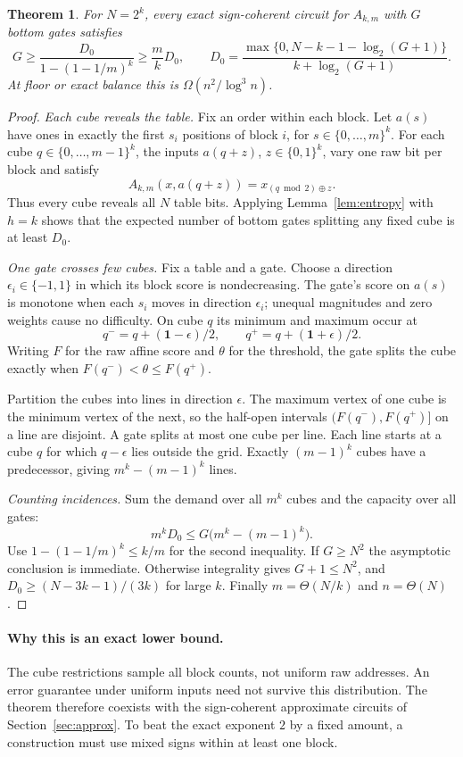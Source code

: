 \documentclass[11pt]{article}
\newtheorem{theorem}{Theorem}[section]
\newcommand{\bits}{\{0,1\}}
\begin{document}
\begin{theorem}\label{thm:coherent}
For $N=2^k$, every exact sign-coherent circuit for $A_{k,m}$ with $G$
bottom gates satisfies
$$
G\ge\frac{D_0}{1-(1-1/m)^k}\ge\frac m kD_0,
\qquad
D_0=\frac{\max\{0,N-k-1-\log_2(G+1)\}}{k+\log_2(G+1)}.
$$
At floor or exact balance this is $\Omega(n^2/\log^3 n)$.
\end{theorem}
\begin{proof}
\emph{Each cube reveals the table.}
Fix an order within each block. Let $a(s)$ have ones in exactly the first
$s_i$ positions of block $i$, for $s\in\{0,\ldots,m\}^k$.
For each cube $q\in\{0,\ldots,m-1\}^k$, the inputs $a(q+z)$,
$z\in\bits^k$, vary one raw bit per block and satisfy
$$A_{k,m}(x,a(q+z))=x_{(q\bmod2)\oplus z}.$$
Thus every cube reveals all $N$ table bits. Applying
Lemma~\ref{lem:entropy} with $h=k$ shows that the expected number of
bottom gates splitting any fixed cube is at least $D_0$.

\emph{One gate crosses few cubes.}
Fix a table and a gate. Choose a direction $\epsilon_i\in\{-1,1\}$ in
which its block score is nondecreasing. The gate's score on
$a(s)$ is monotone when each $s_i$ moves in direction $\epsilon_i$;
unequal magnitudes and zero weights cause no difficulty.
On cube $q$ its minimum and maximum occur at
$$q^-=q+(\mathbf1-\epsilon)/2,\qquad
q^+=q+(\mathbf1+\epsilon)/2.$$
Writing $F$ for the raw affine score and $\theta$ for the threshold, the
gate splits the cube exactly when $F(q^-)<\theta\le F(q^+)$.

Partition the cubes into lines in direction $\epsilon$.
The maximum vertex of one cube is the minimum vertex of the next, so
the half-open intervals $(F(q^-),F(q^+)]$ on a line are disjoint.
A gate splits at most one cube per line. Each line starts at a cube
$q$ for which $q-\epsilon$ lies outside the grid. Exactly $(m-1)^k$ cubes
have a predecessor, giving $m^k-(m-1)^k$ lines.

\emph{Counting incidences.}
Sum the demand over all $m^k$ cubes and the capacity over all gates:
$$m^kD_0\le G\bigl(m^k-(m-1)^k\bigr).$$
Use $1-(1-1/m)^k\le k/m$ for the second inequality.
If $G\ge N^2$ the asymptotic conclusion is immediate. Otherwise integrality
gives $G+1\le N^2$, and $D_0\ge(N-3k-1)/(3k)$ for large $k$.
Finally $m=\Theta(N/k)$ and $n=\Theta(N)$.
\end{proof}

\paragraph{Why this is an exact lower bound.}
The cube restrictions sample all block counts, not uniform raw addresses.
An error guarantee under uniform inputs need not survive this distribution.
The theorem therefore coexists with the sign-coherent approximate circuits
of Section~\ref{sec:approx}. To beat the exact exponent $2$ by a fixed
amount, a construction must use mixed signs within at least one block.
\end{document}
